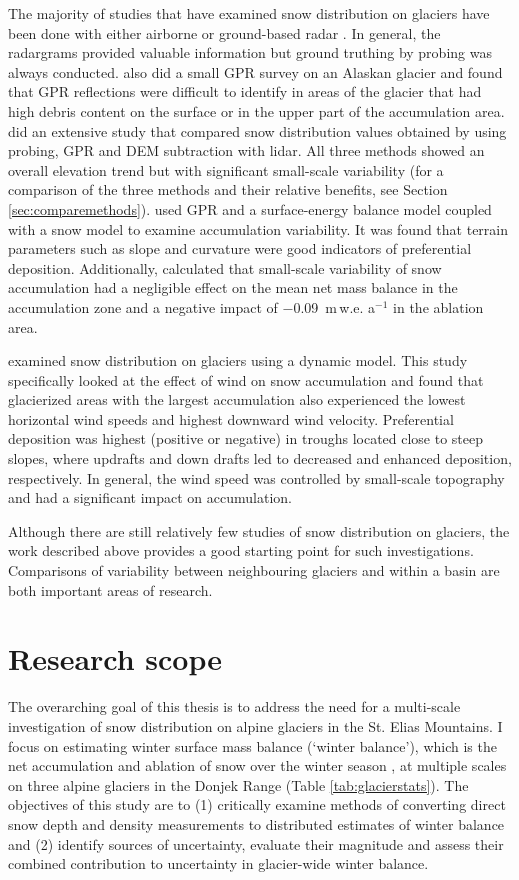 \documentclass{sfuthesis}
\begin{document}
The majority of studies that have examined snow distribution on glaciers have been done with either airborne or ground-based radar \citep[e.g.][]{Winther1998,Machguth2006, Grabiec2011, Pelt2014,McGrath2015}. In general, the radargrams provided valuable information but ground truthing by probing was always conducted. \cite{Gusmeroli2014} also did a small GPR survey on an Alaskan glacier and found that GPR reflections were difficult to identify in areas of the glacier that had high debris content on the surface or in the upper part of the accumulation area. \cite{Sold2013} did an extensive study that compared snow distribution values obtained by using probing, GPR and DEM subtraction with lidar. All three methods showed an overall elevation trend but with significant small-scale variability (for a comparison of the three methods and their relative benefits, see Section \ref{sec:comparemethods}). \cite{Pelt2014} used GPR and a surface-energy balance model coupled with a snow model to examine accumulation variability. It was found that terrain parameters such as slope and curvature were good indicators of preferential deposition. Additionally, \cite{Pelt2014} calculated that small-scale variability of snow accumulation had a negligible effect on the mean net mass balance in the accumulation zone and a negative impact of $-$0.09 \,m\,w.e. a$^{-1}$ in the ablation area.

\cite{Dadic2010} examined snow distribution on glaciers using a dynamic model. This study specifically looked at the effect of wind on snow accumulation and found that glacierized areas with the largest accumulation also experienced the lowest horizontal wind speeds and highest downward wind velocity. Preferential deposition was highest (positive or negative) in troughs located close to steep slopes, where updrafts and down drafts led to decreased and enhanced deposition, respectively. In general, the wind speed was controlled by small-scale topography and had a significant impact on accumulation. 

Although there are still relatively few studies of snow distribution on glaciers, the work described above provides a good starting point for such investigations. Comparisons of variability between neighbouring glaciers and within a basin are both important areas of research.

\section{Research scope}
\label{sec:ResearchScope}
The overarching goal of this thesis is to address the need for a multi-scale investigation of snow distribution on alpine glaciers in the St. Elias Mountains. I focus on estimating winter surface mass balance (`winter balance'), which is the net accumulation and ablation of snow over the winter season \citep{Cogley2011}, at multiple scales on three alpine glaciers in the Donjek Range (Table \ref{tab:glacierstats}). The objectives of this study are to (1) critically examine methods of converting direct snow depth and density measurements to distributed estimates of winter balance and (2) identify sources of uncertainty, evaluate their magnitude and assess their combined contribution to uncertainty in glacier-wide winter balance. 
\end{document}

